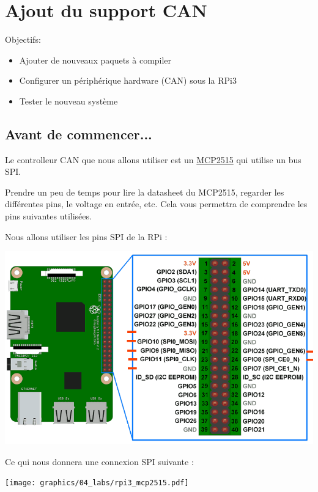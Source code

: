 \chapter{Ajout du support CAN}
{Objectifs:
  \begin{itemize}
  \item Ajouter de nouveaux paquets à compiler
  \item Configurer un périphérique hardware (CAN) sous la RPi3
  \item Tester le nouveau système
  \end{itemize}
}

\section{Avant de commencer...}

Le controlleur CAN que nous allons utiliser est un
\href{https://www.microchip.com/wwwproducts/en/en010406}{MCP2515} qui utilise
un bus SPI.

Prendre un peu de temps pour lire la datasheet du MCP2515, regarder les
différentes pins, le voltage en entrée, etc. Cela vous permettra de comprendre
les pins suivantes utilisées.

Nous allons utiliser les pins SPI de la RPi : \\

\begin{centering}
  \includegraphics[height=0.3\textheight]{pictures/04_labs/rpi3_gpio_layout_spi.png} \\
\end{centering}

Ce qui nous donnera une connexion SPI suivante : \\

\begin{centering}
  \texttt{[image: graphics/04\_labs/rpi3\_mcp2515.pdf]} \\
\end{centering}

